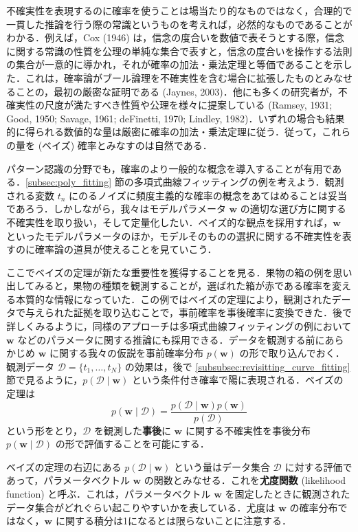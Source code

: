 \documentclass[uplatex,a4paper,oneside,openany,dvipdfmx]{jsarticle}
\numberwithin{equation}{section}
\theoremstyle{mystyle} %
\newcommand{\CD}{\mathcal{D}}
\newcommand{\tb}[1]{\textbf{#1}}
\newcommand{\bs}[1]{\boldsymbol{#1}}
\begin{document}
不確実性を表現するのに確率を使うことは場当たり的なものではなく，合理的で一貫した推論を行う際の常識というものを考えれば，必然的なものであることがわかる．例えば，Cox (1946) は，信念の度合いを数値で表そうとする際，信念に関する常識の性質を公理の単純な集合で表すと，信念の度合いを操作する法則の集合が一意的に導かれ，それが確率の加法・乗法定理と等価であることを示した．これは，確率論がブール論理を不確実性を含む場合に拡張したものとみなせることの，最初の厳密な証明である (Jaynes, 2003)．他にも多くの研究者が，不確実性の尺度が満たすべき性質や公理を様々に提案している (Ramsey, 1931; Good, 1950; Savage, 1961; deFinetti, 1970; Lindley, 1982)．いずれの場合も結果的に得られる数値的な量は厳密に確率の加法・乗法定理に従う．従って，これらの量を (ベイズ) 確率とみなすのは自然である．

パターン認識の分野でも，確率のより一般的な概念を導入することが有用である．\ref{subsec:poly_fitting} 節の多項式曲線フィッティングの例を考えよう．観測される変数 $t_{n}$ にのるノイズに頻度主義的な確率の概念をあてはめることは妥当であろう．しかしながら，我々はモデルパラメータ $\bs{w}$ の適切な選び方に関する不確実性を取り扱い，そして定量化したい．ベイズ的な観点を採用すれば，$\bs{w}$ といったモデルパラメータのほか，モデルそのものの選択に関する不確実性を表すのに確率論の道具が使えることを見ていこう．

ここでベイズの定理が新たな重要性を獲得することを見る．果物の箱の例を思い出してみると，果物の種類を観測することが，選ばれた箱が赤である確率を変える本質的な情報になっていた．この例ではベイズの定理により，観測されたデータで与えられた証拠を取り込むことで，事前確率を事後確率に変換できた．後で詳しくみるように，同様のアプローチは多項式曲線フィッティングの例において $\bs{w}$ などのパラメータに関する推論にも採用できる．データを観測する前にあらかじめ $\bs{w}$ に関する我々の仮説を事前確率分布 $p(\bs{w})$ の形で取り込んでおく．観測データ $\CD = \{t_{1},\ldots,t_{N}\}$ の効果は，後で \ref{subsubsec:revisitting_curve_fitting} 節で見るように，$p(\CD \mid \bs{w})$ という条件付き確率で陽に表現される．ベイズの定理は
\begin{equation} \label{eq:1.43}
    p(\bs{w} \mid \CD) = \frac{p(\CD \mid \bs{w}) p(\bs{w})}{p(\CD)}
\end{equation}
という形をとり，$\CD$ を観測した\tb{事後}に $\bs{w}$ に関する不確実性を事後分布 $p(\bs{w} \mid \CD)$ の形で評価することを可能にする．

ベイズの定理の右辺にある $p(\CD \mid \bs{w})$ という量はデータ集合 $\CD$ に対する評価であって，パラメータベクトル $\bs{w}$ の関数とみなせる．これを\tb{尤度関数} (likelihood function) と呼ぶ．これは，パラメータベクトル $\bs{w}$ を固定したときに観測されたデータ集合がどれぐらい起こりやすいかを表している．尤度は $\bs{w}$ の確率分布ではなく，$\bs{w}$ に関する積分は1になるとは限らないことに注意する．
\end{document}
